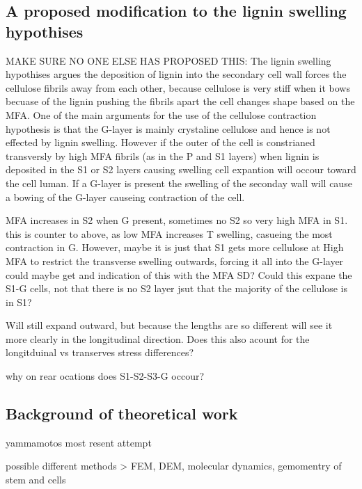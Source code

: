 \documentclass{article}
\begin{document}
\subsection{A proposed modification to the lignin swelling hypothises}
MAKE SURE NO ONE ELSE HAS PROPOSED THIS:
The lignin swelling hypothises argues the deposition of lignin into the
secondary cell wall forces the cellulose fibrils away from each other, because
cellulose is very stiff when it bows becuase of the lignin pushing the fibrils
apart the cell changes shape based on the MFA. One of the main arguments for the
use of the cellulose contraction hypothesis is that the G-layer is mainly
crystaline cellulose and hence is not effected by lignin swelling. However if
the outer of the cell is constrianed transversly by high MFA fibrils (as in the
P and S1 layers) when lignin is deposited in the S1 or S2 layers causing
swelling cell expantion will occour toward the cell luman. If a G-layer is
present the swelling of the seconday wall will cause a bowing of the G-layer
causeing contraction of the cell.

MFA increases in S2 when G present, sometimes no S2 so very high MFA in S1. this
is counter to above, as low MFA increases T swelling, casueing the most
contraction in G. However, maybe it is just that S1 gets more cellulose at High
MFA to restrict the transverse swelling outwards, forcing it all into the
G-layer could maybe get and indication of this with the MFA SD? Could this
expane the S1-G cells, not that there is no S2 layer jsut that the majority of
the cellulose is in S1?

Will still expand outward, but because the lengths are so different will see it
more clearly in the longitudinal direction. Does this also acount for the
longitduinal vs transerves stress differences?

why on rear ocations does S1-S2-S3-G occour?


\subsection{Background of theoretical work}

yammamotos most resent attempt

possible different methods > FEM, DEM, molecular dynamics, gemomentry of stem
and cells
\end{document}
